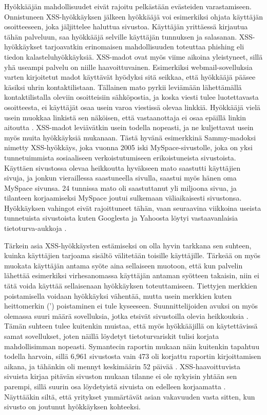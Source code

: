 Hyökkääjän mahdollisuudet eivät rajoitu pelkästään evästeiden varastamiseen. Onnistuneen XSS-hyökkäyksen jälkeen hyökkääjä voi esimerkiksi ohjata
käyttäjän osoitteeseen, joka jäljittelee haluttua sivustoa. Käyttäjän yrittäessä kirjautua tähän palveluun, saa hyökkääjä selville käyttäjän tunnuksen ja
salasanan. XSS-hyökkäykset tarjoavatkin erinomaisen mahdollisuuden toteuttaa phishing eli tiedon kalasteluhyökkäyksiä. XSS-madot ovat
myös viime aikoina yleistyneet, sillä yhä useampi palvelu on niille haavoittuvainen. Esimerkiksi webmail-sovelluksia varten kirjoitetut madot 
käyttävät hyödyksi sitä seikkaa, että hyökkääjä pääsee käsiksi uhrin kontaktilistaan. Tällainen mato pyrkii leviämään lähettämällä 
kontaktilistalla oleviin osoitteisiin sähköpostia, ja koska viesti tulee luotettavasta osoitteesta, ei käyttäjät osaa usein varoa viestissä
olevaa linkkiä. Hyökkääjä vielä usein muokkaa linkistä sen näköisen, että vastaanottaja ei osaa epäillä linkin aitoutta \cite{WEB2}. 
XSS-madot leviävätkin usein todella nopeasti, ja ne kuljettavat usein myös muita hyökkäyksiä mukanaan. Tästä hyvänä esimerkkinä
Sammy-madoksi nimetty XSS-hyökkäys, joka vuonna 2005 iski MySpace-sivustolle, joka on yksi tunnetuimmista sosiaaliseen verkoistutumiseen
erikoistuneista sivustoista. Käyttäen sivustossa olevaa heikkoutta hyväkseen mato saastutti käyttäjien sivuja, ja jonkun vieraillessa 
saastuneella sivulla, saastui myös hänen oma MySpace sivunsa. 24 tunnissa mato oli saastuttanut yli miljoona sivua, ja tilanteen korjaamiseksi
MySpace joutui sulkemaan väliaikaisesti sivustonsa. Hyökkäyksen vahingot eivät rajoittuneet tähän, vaan seuraavina viikkoina useista tunnetuista sivustoista
kuten Googlesta ja Yahoosta löytyi vastaavanlaisia tietoturva-aukkoja \cite{WEB2b}.

Tärkein asia XSS-hyökkäysten estämiseksi on olla hyvin tarkkana sen suhteen, kuinka käyttäjien tarjoama sisältö välitetään toisille käyttäjille.
Tärkeää on myös muokata käyttäjän antama syöte aina sellaiseen muotoon, että kun palvelin lähettää esimerkiksi virhesanomassa käyttäjän antaman syötteen
takaisin, niin ei tätä voida käyttää sellaisenaan hyökkäyksen toteuttamiseen. Tiettyjen merkkien poistamisella voidaan hyökkäyksi vähentää,
mutta usein merkkien kuten heittomerkin (') poistaminen ei tule kyseeseen. Suunnittelijoiden avuksi on myös olemassa suuri määrä sovelluksia, jotka
etsivät sivustoilla olevia heikkouksia \cite{WEB2}. Tämän suhteen tulee kuitenkin muistaa, että myös hyökkääjillä on käytettävissä samat sovellukset, joten 
näillä löydetyt tietoturvariskit tulisi korjata mahdollisimman nopeasti. Symantecin raportin mukaan näin kuitenkin tapahtuu todella harvoin, sillä 6,961 
sivustosta vain 473 oli korjattu raportin kirjoittamisen aikana, ja tähänkin oli mennyt keskimäärin 52 päivää \cite{SYM}. XSS-haavoittuvista sivuista
kirjaa pitävän sivuston mukaan tilanne ei ole nykyisin yhtään sen parempi, sillä suurin osa löydetyistä sivuista on edelleen korjaamatta \cite{XSS}.
Näyttääkin siltä, että yritykset ymmärtävät asian vakavuuden vasta sitten, kun sivusto on joutunut hyökkäyksen kohteeksi.

